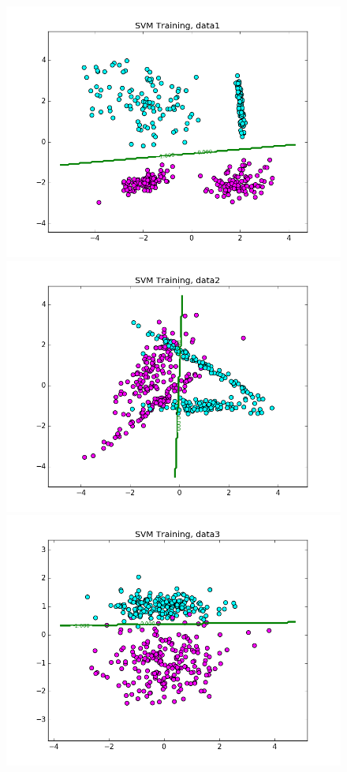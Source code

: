 \documentclass{article}
\begin{document}
\begin{figure}[width=\linewidth]
\centering
\begin{multicols}{2}
  \includegraphics[width=1.2\linewidth]{code/P2/data1,training.png}
  \includegraphics[width=1.2\linewidth]{code/P2/data2,training.png}
  \includegraphics[width=1.2\linewidth]{code/P2/data3,training.png}

\end{multicols}
\end{figure}
\end{document}
